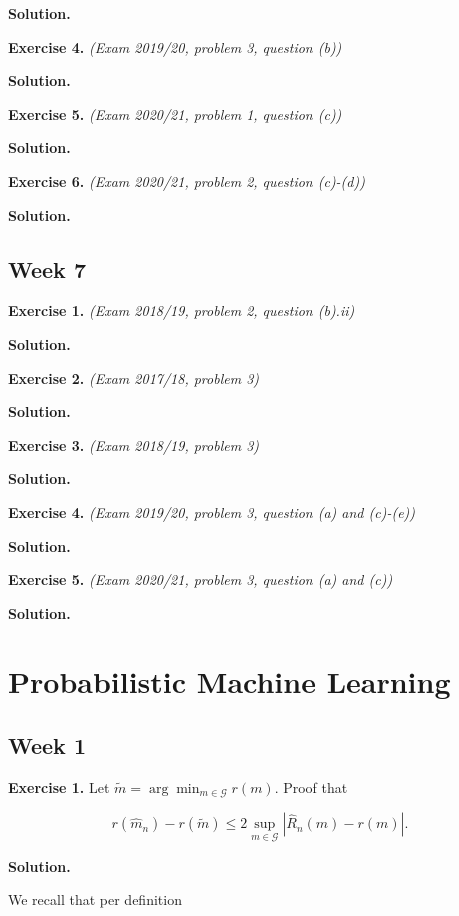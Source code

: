 \documentclass[a4paper,12pt,openany]{book}
\begin{document}
\textbf{Solution.}

\textbf{Exercise 4.} \emph{(Exam 2019/20, problem 3, question (b))}

\textbf{Solution.}

\textbf{Exercise 5.} \emph{(Exam 2020/21, problem 1, question (c))}

\textbf{Solution.}

\textbf{Exercise 6.} \emph{(Exam 2020/21, problem 2, question (c)-(d))}

\textbf{Solution.}

\hypertarget{week-7}{%
\section{Week 7}\label{week-7}}

\textbf{Exercise 1.} \emph{(Exam 2018/19, problem 2, question (b).ii)}

\textbf{Solution.}

\textbf{Exercise 2.} \emph{(Exam 2017/18, problem 3)}

\textbf{Solution.}

\textbf{Exercise 3.} \emph{(Exam 2018/19, problem 3)}

\textbf{Solution.}

\textbf{Exercise 4.} \emph{(Exam 2019/20, problem 3, question (a) and (c)-(e))}

\textbf{Solution.}

\textbf{Exercise 5.} \emph{(Exam 2020/21, problem 3, question (a) and (c))}

\textbf{Solution.}

\hypertarget{probabilistic-machine-learning}{%
\chapter{Probabilistic Machine Learning}\label{probabilistic-machine-learning}}

\hypertarget{week-1-1}{%
\section{Week 1}\label{week-1-1}}

\textbf{Exercise 1.} Let \(\tilde m = \arg\min_{m\in\mathcal G} r(m)\). Proof that

\[
r(\hat m_n)-r(\tilde m)\le 2\sup_{m\in\mathcal G}\left\vert\hat R_n(m)-r(m) \right\vert.
\]

\textbf{Solution.}

We recall that per definition
\end{document}
